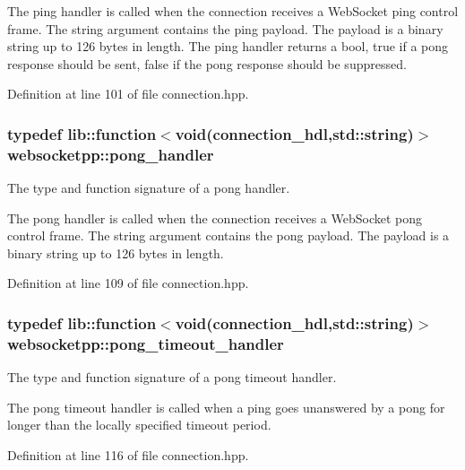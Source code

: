 The ping handler is called when the connection receives a Web\+Socket ping control frame. The string argument contains the ping payload. The payload is a binary string up to 126 bytes in length. The ping handler returns a bool, true if a pong response should be sent, false if the pong response should be suppressed. 

Definition at line 101 of file connection.\+hpp.

\hypertarget{namespacewebsocketpp_a1798d54e6d98a481cf870091af84bc1f}{}
\subsubsection[{pong\+\_\+handler}]{\setlength{\rightskip}{0pt plus 5cm}typedef lib\+::function$<$void({\bf connection\+\_\+hdl},std\+::string)$>$ {\bf websocketpp\+::pong\+\_\+handler}}\label{namespacewebsocketpp_a1798d54e6d98a481cf870091af84bc1f}


The type and function signature of a pong handler. 

The pong handler is called when the connection receives a Web\+Socket pong control frame. The string argument contains the pong payload. The payload is a binary string up to 126 bytes in length. 

Definition at line 109 of file connection.\+hpp.

\hypertarget{namespacewebsocketpp_a2c5925a111b9e553efebea35d5ea155f}{}
\subsubsection[{pong\+\_\+timeout\+\_\+handler}]{\setlength{\rightskip}{0pt plus 5cm}typedef lib\+::function$<$void({\bf connection\+\_\+hdl},std\+::string)$>$ {\bf websocketpp\+::pong\+\_\+timeout\+\_\+handler}}\label{namespacewebsocketpp_a2c5925a111b9e553efebea35d5ea155f}


The type and function signature of a pong timeout handler. 

The pong timeout handler is called when a ping goes unanswered by a pong for longer than the locally specified timeout period. 

Definition at line 116 of file connection.\+hpp.

